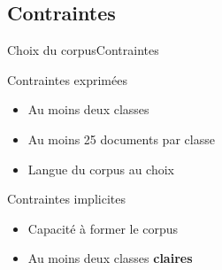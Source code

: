 \subsection{Contraintes}
\begin{frame}{Choix du corpus}{Contraintes}
\begin{block}{Contraintes exprimées}
	\begin{itemize}
	\item Au moins deux classes
	\item Au moins 25 documents par classe
	\item Langue du corpus au choix
	\end{itemize}
\end{block}
\pause
\begin{block}{Contraintes implicites}
	\begin{itemize}
	\item Capacité à former le corpus
	\item Au moins deux classes \textbf{claires}
	\end{itemize}
\end{block}
\end{frame}

